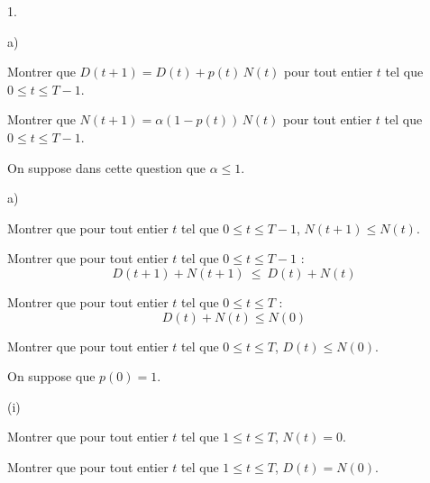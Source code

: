 \begin{noliste}{1.}
  \setlength{\itemsep}{4mm}
  \item 
  \begin{noliste}{a)}
    \setlength{\itemsep}{2mm}
    \item Montrer que $D(t+1)=D(t) + p(t) \, N(t)$ pour tout entier $t$ 
    tel que $0 \leq t \leq T-1$.
    
    
    
    

    
    \item Montrer que $N(t+1)=\alpha (1-p(t)) \, N(t)$ pour tout entier 
    $t$ tel que $0 \leq t \leq T-1$.
    
    
  \end{noliste}
  
  \item On suppose dans cette question que $\alpha \leq 1$.
  \begin{noliste}{a)}
    \setlength{\itemsep}{2mm}
    \item Montrer que pour tout entier $t$ tel que $0 \leq t \leq T-1$,
    $N(t+1) \leq N(t)$.
    
    

    
    \item Montrer que pour tout entier $t$ tel que $0 \leq t \leq T-1$ :
    \[
      D(t+1) + N(t+1) \ \leq \ D(t)+N(t)
    \]
    
    
    
    
   
    
    \item Montrer que pour tout entier $t$ tel que $0 \leq t \leq T$ :
    \[
      D(t) + N(t) \leq N(0)
    \]
    
    

    
    \item Montrer que pour tout entier $t$ tel que $0 \leq t \leq T$, 
    $D(t) \leq N(0)$.
    
    

    
    \item On suppose que $p(0)=1$.
    \begin{nonoliste}{(i)}
      \item Montrer que pour tout entier $t$ tel que $1 \leq t \leq T$, 
      $N(t)=0$.
      
      

      
      \item Montrer que pour tout entier $t$ tel que $1 \leq t \leq T$,
      $D(t)=N(0)$.
      

\end{nonoliste}
\end{noliste}
\end{noliste}
